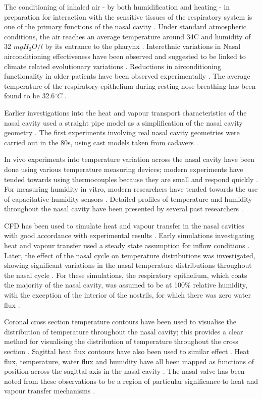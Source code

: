 The conditioning of inhaled air - by both humidification and heating - in preparation for interaction with the sensitive tissues of the respiratory system is one of the primary functions of the nasal cavity \cite{Elad2008}.
Under standard atmospheric conditions, the air reaches an average temperature around 34\degree C and humidity of 32 $mg H_2 O/l$ by its entrance to the pharynx \cite{Keck2000}.
Interethnic variations in Nasal airconditioning effectiveness have been observed and suggested to be linked to climate related evolutionary variations \cite{Noback2011, Yokley2009}.
Reductions in airconditioning functionality in older patients have been observed experimentally \cite{Lindemann2008}.
The average temperature of the respiratory epithelium during resting nose breathing has been found to be 32.6$^{\circ} C$ \cite{Lindemann2002}.

Earlier investigations into the heat and vapour transport characteristics of the nasal cavity used a straight pipe model as a simplification of the nasal cavity geometry \cite{Ingelstedt1961}. The first experiments involving real nasal cavity geometries were carried out in the 80s, using cast models taken from cadavers \cite{Nuckols1983}.

In vivo experiments into temperature variation across the nasal cavity have been done using various temperature measuring devices; modern experiments have tended towards using thermocouples because they are small and respond quickly \cite{Elad2008}. For measuring humidity in vitro, modern researchers have tended towards the use of capacitative humidity sensors \cite{Keck2000}. Detailed profiles of temperature and humidity throughout the nasal cavity have been presented by several past researchers \cite{Keck2000}. 

CFD has been used to simulate heat and vapour transfer in the nasal cavities with good accordance with experimental results \cite{Lindemann2004}. Early simulations investigating heat and vapour transfer used a steady state assumption for inflow conditions \cite{Naftali1998}. Later, the effect of the nasal cycle on temperature distributions was investigated, showing significant variations in the nasal temperature distributions throughout the nasal cycle \cite{Elad2006}. For these simulations, the respiratory epithelium, which coats the majority of the nasal cavity, was assumed to be at 100\% relative humidity, with the exception of the interior of the nostrils, for which there was zero water flux \cite{Elad2006}.

Coronal cross section temperature contours have been used to visualise the distribution of temperature throughout the nasal cavity; this provides a clear method for visualising the distribution of temperature throughout the cross section \cite{Naftali2005}. Sagittal heat flux contours have also been used to similar effect \cite{Sullivan2013}. Heat flux, temperature, water flux and humidity have all been mapped as functions of position across the sagittal axis in the nasal cavity \cite{Garcia2007, Sullivan2013, Yu2014}. The nasal valve has been noted from these observations to be a region of particular significance to heat and vapour transfer mechanisms \cite{Sullivan2013}. 

